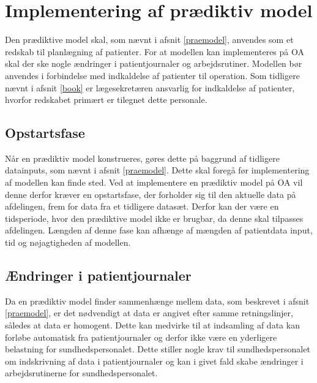\section{Implementering af prædiktiv model}
Den prædiktive model skal, som nævnt i afsnit \ref{praemodel}, anvendes som et redskab til planlægning af patienter. For at modellen kan implementeres på OA skal der ske nogle ændringer i patientjournaler og arbejdsrutiner. Modellen bør anvendes i forbindelse med indkaldelse af patienter til operation. Som tidligere nævnt i afsnit \ref{book} er lægesekretæren ansvarlig for indkaldelse af patienter, hvorfor redskabet primært er tilegnet dette personale. 


\subsection{Opstartsfase}
Når en prædiktiv model konstrueres, gøres dette på baggrund af tidligere datainputs, som nævnt i afsnit \ref{praemodel}. Dette skal foregå før implementering af modellen kan finde sted. Ved at implementere en prædiktiv model på OA vil denne derfor kræver en opstartsfase, der forholder sig til den aktuelle data på afdelingen, frem for data fra et tidligere datasæt. Derfor kan der være en tidsperiode, hvor den prædiktive model ikke er brugbar, da denne skal tilpasses afdelingen. Længden af denne fase kan afhænge af mængden af patientdata input, tid og nøjagtigheden af modellen.\cite{Kuhn2013}


\subsection{Ændringer i patientjournaler}
Da en prædiktiv model finder sammenhænge mellem data, som beskrevet i afsnit \ref{praemodel}, er det nødvendigt at data er angivet efter samme retningslinjer, således at data er homogent\cite{Kuhn2013}. Dette kan medvirke til at indsamling af data kan forløbe automatisk fra patientjournaler og derfor ikke være en yderligere belastning for sundhedspersonalet. Dette stiller nogle krav til sundhedspersonalet om indskrivning af data i patientjournaler og kan i givet fald skabe ændringer i arbejdsrutinerne for sundhedspersonalet.   


